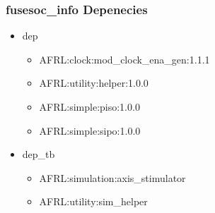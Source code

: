 \subsubsection{fusesoc\_info Depenecies}
\begin{itemize}
\item dep
	\begin{itemize}
	\item AFRL:clock:mod\_clock\_ena\_gen:1.1.1
	\item AFRL:utility:helper:1.0.0
	\item AFRL:simple:piso:1.0.0
	\item AFRL:simple:sipo:1.0.0
	\end{itemize}
\item dep\_tb
	\begin{itemize}
	\item AFRL:simulation:axis\_stimulator
	\item AFRL:utility:sim\_helper
	\end{itemize}
\end{itemize}
